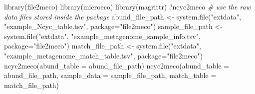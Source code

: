 \documentclass[
]{book}
\newenvironment{Shaded}{\begin{snugshade}}{\end{snugshade}}
\newcommand{\AttributeTok}[1]{\textcolor[rgb]{0.77,0.63,0.00}{#1}}
\newcommand{\CommentTok}[1]{\textcolor[rgb]{0.56,0.35,0.01}{\textit{#1}}}
\newcommand{\FunctionTok}[1]{\textcolor[rgb]{0.00,0.00,0.00}{#1}}
\newcommand{\NormalTok}[1]{#1}
\newcommand{\OtherTok}[1]{\textcolor[rgb]{0.56,0.35,0.01}{#1}}
\newcommand{\StringTok}[1]{\textcolor[rgb]{0.31,0.60,0.02}{#1}}
\begin{document}
\begin{Shaded}
\begin{Highlighting}[]
\FunctionTok{library}\NormalTok{(file2meco)}
\FunctionTok{library}\NormalTok{(microeco)}
\FunctionTok{library}\NormalTok{(magrittr)}
\NormalTok{?ncyc2meco}
\CommentTok{\# use the raw data files stored inside the package}
\NormalTok{abund\_file\_path }\OtherTok{\textless{}{-}} \FunctionTok{system.file}\NormalTok{(}\StringTok{"extdata"}\NormalTok{, }\StringTok{"example\_Ncyc\_table.tsv"}\NormalTok{, }\AttributeTok{package=}\StringTok{"file2meco"}\NormalTok{)}
\NormalTok{sample\_file\_path }\OtherTok{\textless{}{-}} \FunctionTok{system.file}\NormalTok{(}\StringTok{"extdata"}\NormalTok{, }\StringTok{"example\_metagenome\_sample\_info.tsv"}\NormalTok{, }\AttributeTok{package=}\StringTok{"file2meco"}\NormalTok{)}
\NormalTok{match\_file\_path }\OtherTok{\textless{}{-}} \FunctionTok{system.file}\NormalTok{(}\StringTok{"extdata"}\NormalTok{, }\StringTok{"example\_metagenome\_match\_table.tsv"}\NormalTok{, }\AttributeTok{package=}\StringTok{"file2meco"}\NormalTok{)}
\FunctionTok{ncyc2meco}\NormalTok{(}\AttributeTok{abund\_table =}\NormalTok{ abund\_file\_path)}
\FunctionTok{ncyc2meco}\NormalTok{(}\AttributeTok{abund\_table =}\NormalTok{ abund\_file\_path, }\AttributeTok{sample\_data =}\NormalTok{ sample\_file\_path, }\AttributeTok{match\_table =}\NormalTok{ match\_file\_path)}
\end{Highlighting}
\end{Shaded}
\end{document}
